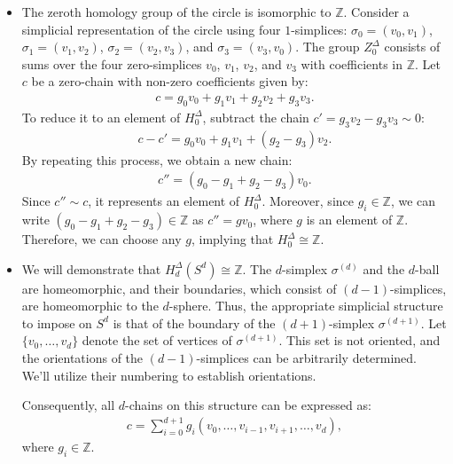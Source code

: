 \begin{example}
\begin{itemize}
\item The zeroth homology group of the circle is isomorphic to \(\mathbb{Z}\).
Consider a simplicial representation of the circle using four \(1\)-simplices:
\(\sigma_{0} = (v_{0}, v_{1})\), \(\sigma_{1} = (v_{1}, v_{2})\), \(\sigma_{2} = (v_{2}, v_{3})\), and \(\sigma_{3} = (v_{3}, v_{0})\).
The group \(Z^{\Delta}_{0}\) consists of sums over the four zero-simplices \(v_{0}\),
\(v_{1}\), \(v_{2}\), and \(v_{3}\) with coefficients in \(\mathbb{Z}\). Let \(c\) be a zero-chain
with non-zero coefficients given by:
\begin{align}
c = g_{0} v_{0} + g_{1} v_{1} + g_{2} v_{2} + g_{3} v_{3}.
\end{align}
To reduce it to an element of \(H^{\Delta}_{0}\), subtract the chain \(c' = g_{3} v_{2} - g_{3} v_{3} \sim 0\):
\begin{align}
c - c' = g_{0} v_{0} + g_{1} v_{1} + (g_{2} - g_{3}) v_{2}.
\end{align}
By repeating this process, we obtain a new chain:
\begin{align}
c'' = (g_{0} - g_{1} + g_{2} - g_{3}) v_{0}.
\end{align}
Since \(c'' \sim c\), it represents an element of \(H^{\Delta}_{0}\). Moreover,
since \(g_{i} \in \mathbb{Z}\), we can write
\((g_{0} - g_{1} + g_{2} - g_{3}) \in \mathbb{Z}\) as \(c'' = g v_{0}\), where \(g\)
is an element of \(\mathbb{Z}\). Therefore, we can choose any \(g\), implying
that \(H^{\Delta}_{0} \cong \mathbb{Z}\).

\item We will demonstrate that \(H^{\Delta}_{d}(S^{d}) \cong \mathbb{Z}\). The
\(d\)-simplex \(\sigma^{(d)}\) and the \(d\)-ball are homeomorphic, and their boundaries,
which consist of \((d-1)\)-simplices, are homeomorphic to the \(d\)-sphere.
Thus, the appropriate simplicial structure to impose on \(S^{d}\) is that of
the boundary of the \((d+1)\)-simplex \(\sigma^{(d+1)}\). Let
\(\{v_{0}, \ldots, v_{d}\}\) denote the set of vertices of
\(\sigma^{(d+1)}\). This set is not oriented, and the orientations of the
\((d-1)\)-simplices can be arbitrarily determined. We'll utilize their numbering
to establish orientations.

Consequently, all \(d\)-chains on this structure can be expressed as:
\begin{align}
\label{chain}
c = \sum_{i=0}^{d+1}g_{i} (v_{0}, \ldots, v_{i-1}, v_{i+1}, \ldots, v_{d}),
\end{align}
where \(g_{i} \in \mathbb{Z}\).


\end{itemize}
\end{example}
